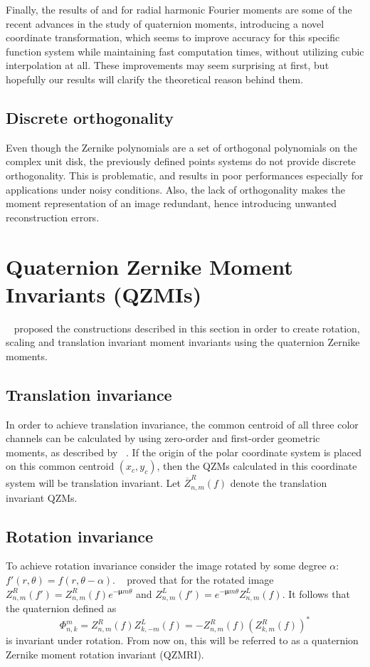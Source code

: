 Finally, the results of \citeauthor{WangAcc} \cite{WangAcc} and \citeauthor{LiuAcc} \cite{LiuAcc} for radial harmonic Fourier moments are some of the recent advances in the study of quaternion moments, introducing a novel coordinate transformation, which seems to improve accuracy for this specific function system while maintaining fast computation times, without utilizing cubic interpolation at all. These improvements may seem surprising at first, but hopefully our results will clarify the theoretical reason behind them.

\subsection{Discrete orthogonality}
Even though the Zernike polynomials are a set of orthogonal polynomials on the complex unit disk, the previously defined points systems do not provide discrete orthogonality. 
This is problematic, and results in poor performances especially for applications under noisy conditions.
Also, the lack of orthogonality makes the moment representation of an image redundant, hence introducing unwanted reconstruction errors.

\section{Quaternion Zernike Moment Invariants (QZMIs)}\label{sec:invariance}
\citeauthor{qzmi}~\cite{qzm, qzmi} proposed the constructions described in this section in order to create rotation, scaling and translation invariant moment invariants using the quaternion Zernike moments.

\subsection{Translation invariance}
In order to achieve translation invariance, the common centroid of all three color channels can be calculated by using zero-order and first-order geometric moments, as described by \citeauthor{affine_color}~\cite{affine_color}.
If the origin of the polar coordinate system is placed on this common centroid $(x_c, y_c)$, then the QZMs calculated in this coordinate system will be translation invariant. Let $\overline{Z}_{n,m}^R(f)$ denote the translation invariant QZMs.

\subsection{Rotation invariance}
To achieve rotation invariance consider the image rotated by some degree $\alpha$: $f'(r,\theta) = f(r, \theta - \alpha)$. \citeauthor{qzmi}~\cite{qzmi} proved that for the rotated image $Z_{n,m}^R(f') = Z_{n,m}^R(f)e^{-\bm{\mu}m\theta}$ and $Z_{n,m}^L(f') = e^{-\bm{\mu}m\theta}Z_{n,m}^L(f)$. It follows that the quaternion defined as 
$$\Phi_{n,k}^m = Z_{n,m}^R(f)Z_{k,-m}^L(f) = -Z_{n,m}^R(f)(Z_{k,m}^R(f))^*$$
is invariant under rotation. From now on, this will be referred to as a quaternion Zernike moment rotation invariant (QZMRI).

